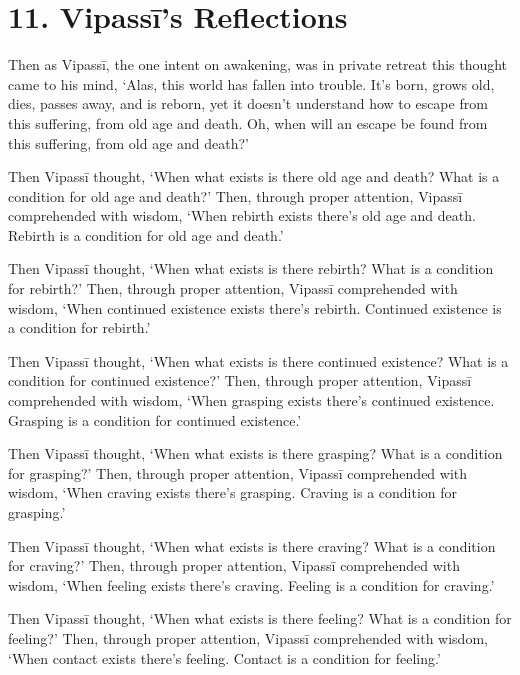 \documentclass[12pt,openany]{book}%
\begin{document}
\section*{11. \textsanskrit{Vipassī}’s Reflections }

Then as \textsanskrit{Vipassī}, the one intent on awakening, was in private retreat this thought came to his mind, ‘Alas, this world has fallen into trouble. It’s born, grows old, dies, passes away, and is reborn, yet it doesn’t understand how to escape from this suffering, from old age and death. Oh, when will an escape be found from this suffering, from old age and death?’ 

Then \textsanskrit{Vipassī} thought, ‘When what exists is there old age and death? What is a condition for old age and death?’ Then, through proper attention, \textsanskrit{Vipassī} comprehended with wisdom, ‘When rebirth exists there’s old age and death. Rebirth is a condition for old age and death.’ 

Then \textsanskrit{Vipassī} thought, ‘When what exists is there rebirth? What is a condition for rebirth?’ Then, through proper attention, \textsanskrit{Vipassī} comprehended with wisdom, ‘When continued existence exists there’s rebirth. Continued existence is a condition for rebirth.’ 

Then \textsanskrit{Vipassī} thought, ‘When what exists is there continued existence? What is a condition for continued existence?’ Then, through proper attention, \textsanskrit{Vipassī} comprehended with wisdom, ‘When grasping exists there’s continued existence. Grasping is a condition for continued existence.’ 

Then \textsanskrit{Vipassī} thought, ‘When what exists is there grasping? What is a condition for grasping?’ Then, through proper attention, \textsanskrit{Vipassī} comprehended with wisdom, ‘When craving exists there’s grasping. Craving is a condition for grasping.’ 

Then \textsanskrit{Vipassī} thought, ‘When what exists is there craving? What is a condition for craving?’ Then, through proper attention, \textsanskrit{Vipassī} comprehended with wisdom, ‘When feeling exists there’s craving. Feeling is a condition for craving.’ 

Then \textsanskrit{Vipassī} thought, ‘When what exists is there feeling? What is a condition for feeling?’ Then, through proper attention, \textsanskrit{Vipassī} comprehended with wisdom, ‘When contact exists there’s feeling. Contact is a condition for feeling.’ 
\end{document}
